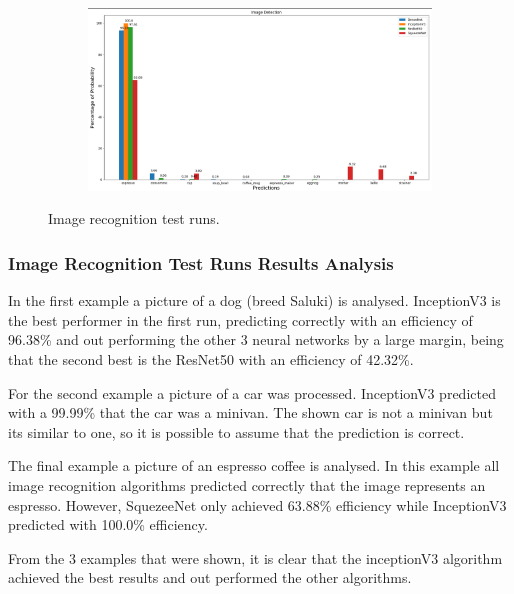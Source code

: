\begin{figure}[H]
\begin{subfigure}{0.25\textwidth}
      \end{subfigure}
      \begin{subfigure}{0.74\textwidth}
      \includegraphics[width=\textwidth]{Sections/4InitialWork/4_images/run4_res.png}
      \end{subfigure}
      
      \caption{Image recognition test runs.}
      \end{figure}


\newpage

\subsubsection{Image Recognition Test Runs Results Analysis}
\label{sec:results_image}


In the first example a picture of a dog (breed Saluki) is analysed. InceptionV3 is the best performer in the first run, predicting correctly with an efficiency of 96.38\% and out performing the other 3 neural networks by a large margin, being that the second best is the ResNet50 with an efficiency of 42.32\%.

For the second example a picture of a car was processed. InceptionV3 predicted with a 99.99\% that the car was a minivan. The shown car is not a minivan but its similar to one, so it is possible to assume that the prediction is correct.

The final example a picture of an espresso coffee is analysed. In this example all image recognition algorithms predicted correctly that the image represents an espresso. However, SquezeeNet only achieved 63.88\% efficiency while InceptionV3 predicted with 100.0\% efficiency.

From the 3 examples that were shown, it is clear that the inceptionV3 algorithm achieved the best results and out performed the other algorithms.






